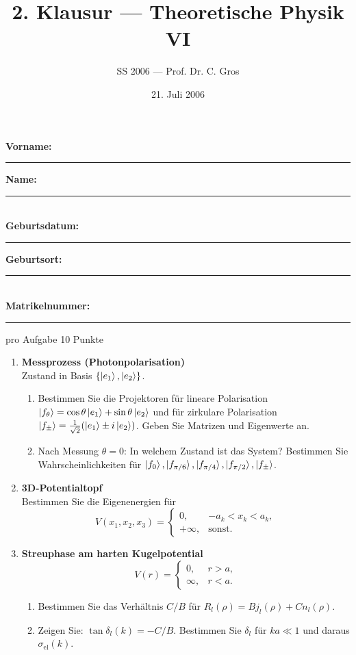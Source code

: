 \documentclass[11pt,a4paper]{article}
\begin{document}
\title{2. Klausur — Theoretische Physik VI}
\author{SS 2006 — Prof. Dr. C. Gros}
\date{21. Juli 2006}


\noindent\textbf{Vorname:} \rule{0.4\linewidth}{0.4pt}\quad
\textbf{Name:} \rule{0.4\linewidth}{0.4pt}\\[0.5em]
\textbf{Geburtsdatum:} \rule{0.3\linewidth}{0.4pt}\quad
\textbf{Geburtsort:} \rule{0.4\linewidth}{0.4pt}\\[0.5em]
\textbf{Matrikelnummer:} \rule{0.5\linewidth}{0.4pt}

\vspace{1em}
\noindent pro Aufgabe 10 Punkte

\begin{enumerate}

\item \textbf{Messprozess (Photonpolarisation)}\\
Zustand in Basis $\{\ket{e_1},\ket{e_2}\}$.
\begin{enumerate}
  \item Bestimmen Sie die Projektoren für lineare Polarisation $\ket{f_\theta}=\cos\theta\ket{e_1}+\sin\theta\ket{e_2}$ und für zirkulare Polarisation $\ket{f_\pm}=\tfrac{1}{\sqrt{2}}(\ket{e_1}\pm i\ket{e_2})$. Geben Sie Matrizen und Eigenwerte an.
  \item Nach Messung $\theta=0$: In welchem Zustand ist das System? Bestimmen Sie Wahrscheinlichkeiten für $\ket{f_0},\ket{f_{\pi/6}},\ket{f_{\pi/4}},\ket{f_{\pi/2}},\ket{f_\pm}$.
\end{enumerate}

\item \textbf{3D-Potentialtopf}\\
Bestimmen Sie die Eigenenergien für
\[
V(x_1,x_2,x_3)=\begin{cases}
0, & -a_k<x_k<a_k,\\
+\infty, & \text{sonst}.
\end{cases}
\]

\item \textbf{Streuphase am harten Kugelpotential}\\
\[
V(r)=\begin{cases}
0,& r>a,\\
\infty,& r<a.
\end{cases}
\]
\begin{enumerate}
  \item Bestimmen Sie das Verhältnis $C/B$ für $R_l(\rho)=B j_l(\rho)+C n_l(\rho)$.
  \item Zeigen Sie: $\tan\delta_l(k)=-C/B$. Bestimmen Sie $\delta_l$ für $ka\ll1$ und daraus $\sigma_{\text{el}}(k)$.
\end{enumerate}


\end{enumerate}
\end{document}

